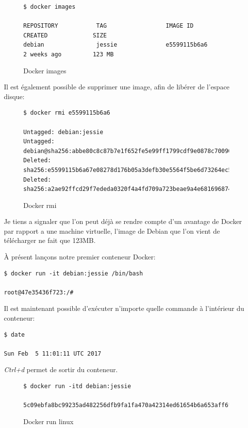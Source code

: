 \begin{figure}[H] 
\centering 
\begin{lstlisting}[frame=single]
$ docker images

REPOSITORY           TAG                 IMAGE ID            CREATED             SIZE
debian               jessie              e5599115b6a6        2 weeks ago         123 MB
\end{lstlisting}
\caption[Code - Docker images]{Docker images}
\label{fig:dockerImage} 
\end{figure}

Il est également possible de supprimer une image, afin de libérer de l'espace disque:

\begin{figure}[H] 
\centering 
\begin{lstlisting}[frame=single]
$ docker rmi e5599115b6a6

Untagged: debian:jessie
Untagged: debian@sha256:abbe80c8c87b7e1f652fe5e99ff1799cdf9e0878c7009035afe1bccac129cad8
Deleted: sha256:e5599115b6a67e08278d176b05a3defb30e5564f5be6d73264ec560b484514a2
Deleted: sha256:a2ae92ffcd29f7ededa0320f4a4fd709a723beae9a4e681696874932db7aee2c
\end{lstlisting}
\caption[Code - Docker rmi]{Docker rmi}
\label{fig:dockerRmi} 
\end{figure}

Je tiens a signaler que l'on peut déjà se rendre compte d'un avantage de Docker par rapport a une machine virtuelle, l'image de Debian que l'on vient de télécharger ne fait que 123MB.

À présent lançons notre premier conteneur Docker:

\begin{lstlisting}[frame=single]
$ docker run -it debian:jessie /bin/bash

root@47e35436f723:/# 
\end{lstlisting}


Il est maintenant possible d'exécuter n’importe quelle commande à l'intérieur du conteneur:

\begin{lstlisting}[frame=single]
$ date

Sun Feb  5 11:01:11 UTC 2017
\end{lstlisting}

\emph{Ctrl+d} permet de sortir du conteneur.

\begin{figure}[H] 
\centering 
\begin{lstlisting}[frame=single]
$ docker run -itd debian:jessie

5c09ebfa8bc99235ad482256dfb9fa1fa470a42314ed61654b6a653aff6fee6b
\end{lstlisting}
\caption[Docker run linux]{Docker run linux}
\label{fig:DockerRunLinux} 
\end{figure}

